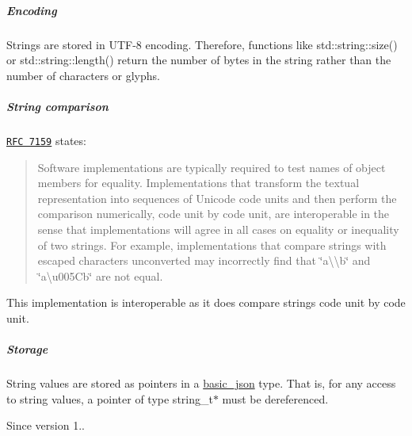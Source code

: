 \subparagraph*{Encoding}

Strings are stored in U\+T\+F-\/8 encoding. Therefore, functions like {\ttfamily std\+::string\+::size()} or {\ttfamily std\+::string\+::length()} return the number of bytes in the string rather than the number of characters or glyphs.

\subparagraph*{String comparison}

\href{http://rfc7159.net/rfc7159}{\tt R\+FC 7159} states\+: \begin{quote}
Software implementations are typically required to test names of object members for equality. Implementations that transform the textual representation into sequences of Unicode code units and then perform the comparison numerically, code unit by code unit, are interoperable in the sense that implementations will agree in all cases on equality or inequality of two strings. For example, implementations that compare strings with escaped characters unconverted may incorrectly find that {\ttfamily \char`\"{}a\textbackslash{}\textbackslash{}b\char`\"{}} and {\ttfamily \char`\"{}a\textbackslash{}u005\+Cb\char`\"{}} are not equal. \end{quote}


This implementation is interoperable as it does compare strings code unit by code unit.

\subparagraph*{Storage}

String values are stored as pointers in a \mbox{\hyperlink{classnlohmann_1_1basic__json}{basic\+\_\+json}} type. That is, for any access to string values, a pointer of type {\ttfamily string\+\_\+t$\ast$} must be dereferenced.

\begin{DoxySince}{Since}
version 1.. 
\end{DoxySince}
\mbox{\label{classnlohmann_1_1basic__json_a4010e8e268fefd86da773c10318f2902}} 
